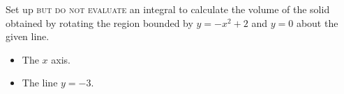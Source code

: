 \label{problemVolumeAreay=-x^2+2andy=0rotatedAroundy=0andy=-3}
Set up \textsc{but do not evaluate} an integral to calculate the volume of the solid obtained by rotating the region bounded by $y=-x^2+2$ and $y=0$ about the given line. 

\begin{itemize}
\item The $x$ axis.
\item The line $y=-3$.
\end{itemize}
